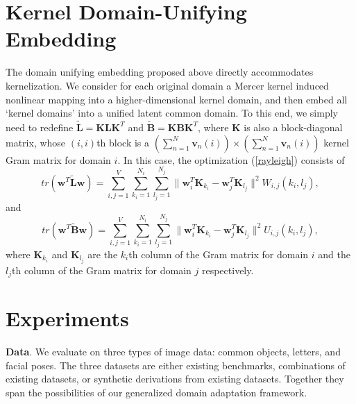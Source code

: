\documentclass[10pt,twocolumn,letterpaper]{article}
\begin{document}
 
\section{Kernel Domain-Unifying Embedding}


The domain unifying embedding proposed above directly accommodates kernelization. We consider for each original domain a Mercer kernel induced nonlinear mapping into a higher-dimensional kernel domain, and then embed all `kernel domains' into a unified latent common domain. To this end, we simply need to redefine $\tilde{\mathbf{L}}=\mathbf{K}\mathbf{L}\mathbf{K}^{T}$ and $\tilde{\mathbf{B}}=\mathbf{K}\mathbf{B}\mathbf{K}^{T}$, where $\mathbf{K}$ is also a block-diagonal matrix, whose $(i,i)$th block is a $(\sum_{n=1}^{N}\mathbf{v}_{n}(i))\times(\sum_{n=1}^{N}\mathbf{v}_{n}(i))$ kernel Gram matrix for domain $i$. In this case, the optimization (\ref{rayleigh}) consists of
 \begin{equation}
tr(\mathbf{w}^{T}\tilde{\mathbf{L}}\mathbf{w})=\sum_{i,j=1}^{V}\sum_{k_{i}=1}^{N_i}\sum_{l_{j}=1}^{N_j}\|\mathbf{w}_{i}^{T}\mathbf{K}_{k_{i}}-\mathbf{w}_{j}^{T}\mathbf{K}_{l_{j}}\|^{2}W_{i,j}(k_{i},l_{j}),
\end{equation}
and
\begin{equation}
tr(\mathbf{w}^{T}\tilde{\mathbf{B}}\mathbf{w})=\sum_{i,j=1}^{V}\sum_{k_{i}=1}^{N_i}\sum_{l_{j}=1}^{N_j}\|\mathbf{w}_{i}^{T}\mathbf{K}_{k_{i}}-\mathbf{w}_{j}^{T}\mathbf{K}_{l_{j}}\|^{2}U_{i,j}(k_{i},l_{j}),
\end{equation}
where $\mathbf{K}_{k_{i}}$ and $\mathbf{K}_{l_{j}}$ are the $k_{i}$th column of the Gram matrix for domain $i$ and the $l_{j}$th column of the Gram matrix for domain $j$ respectively.


\section{Experiments}
\label{exp}


\noindent\textbf{Data}. We evaluate on three types of image data: common objects, letters, and facial poses. The three datasets are either existing benchmarks, combinations of existing datasets, or synthetic derivations from existing datasets. Together they span the possibilities of our generalized domain adaptation framework.

\end{document}
